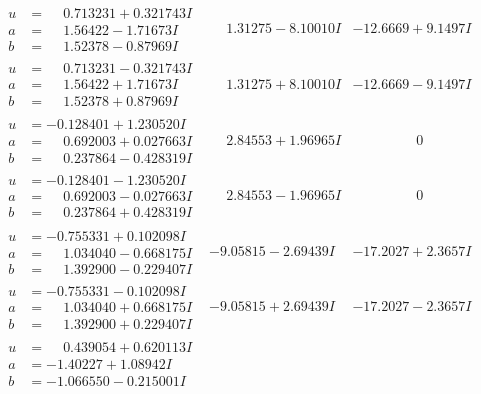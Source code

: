\documentclass[1p]{elsarticle_modified}
\theoremstyle{definition}
\begin{document}
$$\begin{array}{c|c|c}
\begin{aligned}
u &= \phantom{-}0.713231 + 0.321743 I \\
a &= \phantom{-}1.56422 - 1.71673 I \\
b &= \phantom{-}1.52378 - 0.87969 I\end{aligned}
 & \phantom{-}1.31275 - 8.10010 I & -12.6669 + 9.1497 I \\ \hline\begin{aligned}
u &= \phantom{-}0.713231 - 0.321743 I \\
a &= \phantom{-}1.56422 + 1.71673 I \\
b &= \phantom{-}1.52378 + 0.87969 I\end{aligned}
 & \phantom{-}1.31275 + 8.10010 I & -12.6669 - 9.1497 I \\ \hline\begin{aligned}
u &= -0.128401 + 1.230520 I \\
a &= \phantom{-}0.692003 + 0.027663 I \\
b &= \phantom{-}0.237864 - 0.428319 I\end{aligned}
 & \phantom{-}2.84553 + 1.96965 I & \phantom{-0.000000 } 0 \\ \hline\begin{aligned}
u &= -0.128401 - 1.230520 I \\
a &= \phantom{-}0.692003 - 0.027663 I \\
b &= \phantom{-}0.237864 + 0.428319 I\end{aligned}
 & \phantom{-}2.84553 - 1.96965 I & \phantom{-0.000000 } 0 \\ \hline\begin{aligned}
u &= -0.755331 + 0.102098 I \\
a &= \phantom{-}1.034040 - 0.668175 I \\
b &= \phantom{-}1.392900 - 0.229407 I\end{aligned}
 & -9.05815 - 2.69439 I & -17.2027 + 2.3657 I \\ \hline\begin{aligned}
u &= -0.755331 - 0.102098 I \\
a &= \phantom{-}1.034040 + 0.668175 I \\
b &= \phantom{-}1.392900 + 0.229407 I\end{aligned}
 & -9.05815 + 2.69439 I & -17.2027 - 2.3657 I \\ \hline\begin{aligned}
u &= \phantom{-}0.439054 + 0.620113 I \\
a &= -1.40227 + 1.08942 I \\
b &= -1.066550 - 0.215001 I\end{aligned}

\end{array}$$
\end{document}
